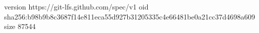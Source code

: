 version https://git-lfs.github.com/spec/v1
oid sha256:b98b9b8c3687f14e811eca55d927b31205335c4e66481be0a21cc37d4698a609
size 87544
